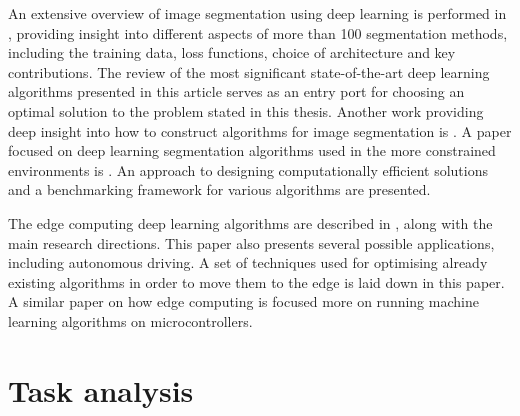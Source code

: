 \documentclass[a4paper,twoside,12pt]{book}
\begin{document}
An extensive overview of image segmentation using deep learning is performed in \cite{minaee2021image}, providing insight into different aspects of more than 100 segmentation methods, including the training data, loss functions, choice of architecture and key contributions. The review of the most significant state-of-the-art deep learning algorithms presented in this article serves as an entry port for choosing an optimal solution to the problem stated in this thesis. Another work providing deep insight into how to construct algorithms for image segmentation is \cite{ghosh2019understanding}. A paper focused on deep learning segmentation algorithms used in the more constrained environments is \cite{siam2018comparative}. An approach to designing computationally efficient solutions and a benchmarking framework for various algorithms are presented.

The edge computing deep learning algorithms are described in \cite{vestias2020moving}, along with the main research directions. This paper also presents several possible applications, including autonomous driving. A set of techniques used for optimising already existing algorithms in order to move them to the edge is laid down in this paper. A similar paper on how edge computing is \cite{merenda2020edge} focused more on running machine learning algorithms on microcontrollers.







\chapter{Task analysis}
\end{document}
